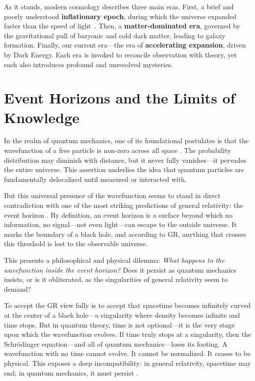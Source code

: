 \documentclass[12pt]{article}
\begin{document}
As it stands, modern cosmology describes three main eras. First, a brief and poorly understood \textbf{inflationary epoch}, during which the universe expanded faster than the speed of light~\citep{guth1981}. Then, a \textbf{matter-dominated era}, governed by the gravitational pull of baryonic and cold dark matter, leading to galaxy formation. Finally, our current era---the era of \textbf{accelerating expansion}, driven by Dark Energy. Each era is invoked to reconcile observation with theory, yet each also introduces profound and unresolved mysteries.


\newpage
\section{Event Horizons and the Limits of Knowledge}

In the realm of quantum mechanics, one of its foundational postulates is that the wavefunction of a free particle is non-zero across all space \citep{griffiths_qm}. The probability distribution may diminish with distance, but it never fully vanishes---it pervades the entire universe. This assertion underlies the idea that quantum particles are fundamentally delocalized until measured or interacted with.

But this universal presence of the wavefunction seems to stand in direct contradiction with one of the most striking predictions of general relativity: the event horizon \citep{britannica_event_horizon, schwarzschild1916}. By definition, an event horizon is a surface beyond which no information, no signal---not even light---can escape to the outside universe. It marks the boundary of a black hole, and according to GR, anything that crosses this threshold is lost to the observable universe.

This presents a philosophical and physical dilemma: \textit{What happens to the wavefunction inside the event horizon?} Does it persist as quantum mechanics insists, or is it obliterated, as the singularities of general relativity seem to demand?

To accept the GR view fully is to accept that spacetime becomes infinitely curved at the center of a black hole---a singularity where density becomes infinite and time stops. But in quantum theory, time is not optional---it is the very stage upon which the wavefunction evolves. If time truly stops at a singularity, then the Schrödinger equation---and all of quantum mechanics---loses its footing. A wavefunction with no time cannot evolve. It cannot be normalized. It ceases to be physical. This exposes a deep incompatibility: in general relativity, spacetime may end; in quantum mechanics, it must persist \citep{hawking1976}.
\end{document}
